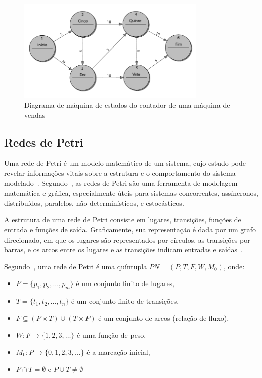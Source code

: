 \begin{figure}[ht]
	\caption{\label{fig:fsm_2}Diagrama de máquina de estados do contador de uma máquina de vendas}
	\begin{center}
	    \includegraphics[width=0.8\textwidth]{resources/fsm_wagner}
	\end{center}
\end{figure}


\subsection{Redes de Petri}

Uma rede de Petri é um modelo matemático de um sistema, cujo estudo pode revelar informações vitais sobre a estrutura e o comportamento do sistema modelado~\cite{peterson:1981}. Segundo~, as redes de Petri são uma ferramenta de modelagem matemática e gráfica, especialmente úteis para sistemas concorrentes, assíncronos, distribuídos, paralelos, não-determinísticos, e estocásticos.

A estrutura de uma rede de Petri consiste em lugares, transições, funções de entrada e funções de saída. Graficamente, sua representação é dada por um grafo direcionado, em que os lugares são representados por círculos, as transições por barras, e os arcos entre os lugares e as transições indicam entradas e saídas~\cite{peterson:1981}. %

Segundo~, uma rede de Petri é uma quíntupla \(PN = (P, T, F, W, M_0)\), onde:
\begin{itemize}
    \item \(P = \{p_1, p_2, \ldots , p_m\}\) é um conjunto finito de lugares,
    \item \(T = \{t_1, t_2, \ldots, t_n\}\) é um conjunto finito de transições,
    \item \(F \subseteq (P \times T) \cup (T \times P)\) é um conjunto de arcos (relação de fluxo),
    \item \(W: F \to \{1,2,3,\ldots\}\) é uma função de peso,
    \item \(M_0: P \to \{0,1,2,3,\ldots\}\) é a marcação inicial,
    \item \(P \cap T = \emptyset\) e \(P \cup T \neq \emptyset\)
\end{itemize}

